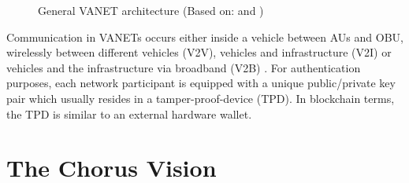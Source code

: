 \documentclass{llncs}
\begin{document}
{\begin{figure}[ht]
				\caption{General VANET architecture (Based on: \protect\cite{baldessari2007car} and \cite{leiding2016self})}
				\label{fig:vanets}
			\end{figure}			
			Communication in VANETs occurs either inside a vehicle between AUs and OBU, wirelessly between different vehicles (V2V), vehicles and infrastructure (V2I) or vehicles and the infrastructure via broadband (V2B) \cite{faezipour2012progress}. For authentication purposes, each network participant is equipped with a unique public/private key pair which usually resides in a tamper-proof-device (TPD). In blockchain terms, the TPD is similar to an external hardware wallet.
			
		


	\section{The Chorus Vision}
		\label{s:section-3}
		
		
%
%		
%			
%
%				
%			
%
%
%

				

}
\end{document}
